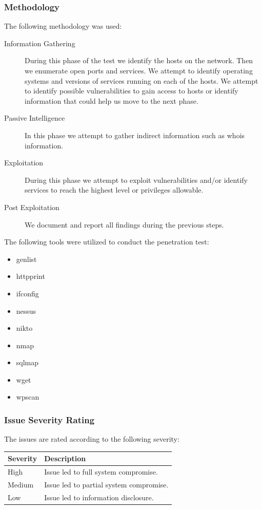 \documentclass{article}
\begin{document}
\subsubsection{Methodology}

The following methodology was used:

\begin{description}
  \item[Information Gathering] During this phase of the test we identify the hosts on the network. Then we enumerate open ports and services. We attempt to identify operating systems and versions of services running on each of the hosts. We attempt to identify possible vulnerabilities to gain access to hosts or identify information that could help us move to the next phase.
  \item[Passive Intelligence] In this phase we attempt to gather indirect information such as whois information.
  \item[Exploitation] During this phase we attempt to exploit vulnerabilities and/or identify services to reach the highest level or privileges allowable.
  \item[Post Exploitation] We document and report all findings during the previous steps.
\end{description}

The following tools were utilized to conduct the penetration test:

\begin{itemize}
  \item genlist
  \item httpprint
  \item ifconfig
  \item nessus
  \item nikto
  \item nmap
  \item sqlmap
  \item wget
  \item wpscan
\end{itemize}

\subsubsection{Issue Severity Rating}

The issues are rated according to the following severity:

\begin{center}
  \begin{tabular}{ | l | l | }
    \hline
    \textbf{Severity} & \textbf{Description} \\ \hline \hline
    High & Issue led to full system compromise. \\ \hline
    Medium & Issue led to partial system compromise. \\ \hline
    Low & Issue led to information disclosure. \\
    \hline
  \end{tabular}
\end{center}
\end{document}

